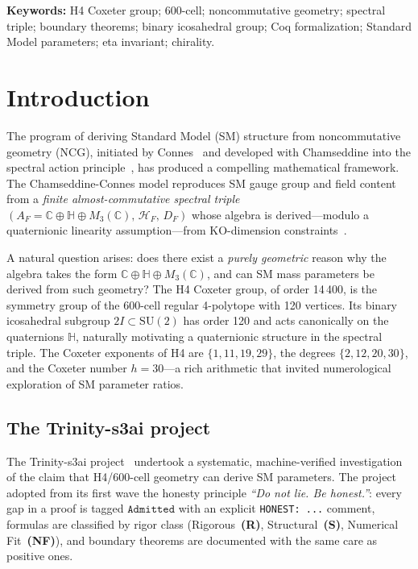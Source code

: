 \documentclass[12pt,a4paper]{article}
\newcommand{\HF}{\mathcal{H}_F}
\newcommand{\DF}{D_F}
\newcommand{\TwoI}{2I}
\newcommand{\Admitted}{\texttt{Admitted}}
\newcommand{\Rclass}{\textbf{(R)}}
\newcommand{\Sclass}{\textbf{(S)}}
\newcommand{\NFclass}{\textbf{(NF)}}
\begin{document}
\textbf{Keywords:} H4 Coxeter group; 600-cell; noncommutative geometry; spectral triple;
boundary theorems; binary icosahedral group; Coq formalization; Standard Model parameters;
eta invariant; chirality.

\tableofcontents

\newpage

\section{Introduction}
\label{sec:intro}

The program of deriving Standard Model (SM) structure from noncommutative geometry (NCG),
initiated by Connes~\cite{Connes:1994yd} and developed with Chamseddine into the spectral
action principle~\cite{Chamseddine:1996zu,Chamseddine:1996rw}, has produced a compelling
mathematical framework. The Chamseddine-Connes model reproduces SM gauge group and field
content from a \emph{finite almost-commutative spectral triple}
\((A_F = \mathbb{C} \oplus \mathbb{H} \oplus M_3(\mathbb{C}),\,\HF,\,\DF)\) whose algebra is
derived---modulo a quaternionic linearity assumption---from KO-dimension
constraints~\cite{Chamseddine:2007oz,Chamseddine:2007ia}.

A natural question arises: does there exist a \emph{purely geometric} reason why the algebra
takes the form \(\mathbb{C} \oplus \mathbb{H} \oplus M_3(\mathbb{C})\), and can SM mass
parameters be derived from such geometry? The H4 Coxeter group, of order 14\,400, is the
symmetry group of the 600-cell regular 4-polytope with 120 vertices. Its binary icosahedral
subgroup \(\TwoI \subset \mathrm{SU}(2)\) has order 120 and acts canonically on the quaternions
\(\mathbb{H}\), naturally motivating a quaternionic structure in the spectral triple.
The Coxeter exponents of H4 are \(\{1, 11, 19, 29\}\), the degrees \(\{2, 12, 20, 30\}\),
and the Coxeter number \(h = 30\)---a rich arithmetic that invited numerological exploration of SM
parameter ratios.

\subsection{The Trinity-s3ai project}

The Trinity-s3ai project~\cite{trinity_repo} undertook a systematic, machine-verified
investigation of the claim that H4/600-cell geometry can derive SM parameters. The project
adopted from its first wave the honesty principle \emph{``Do not lie. Be honest.''}: every gap
in a proof is tagged \(\Admitted\) with an explicit \texttt{HONEST:~...} comment, formulas are
classified by rigor class (Rigorous~\Rclass, Structural~\Sclass, Numerical Fit~\NFclass),
and boundary theorems are documented with the same care as positive ones.
\end{document}

